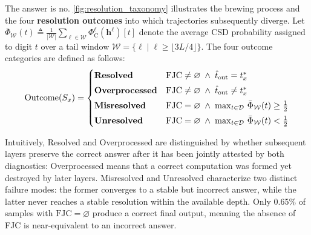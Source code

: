 The answer is no. \cref{fig:resolution_taxonomy} illustrates the brewing process and the four \textbf{resolution outcomes} into which trajectories subsequently diverge. Let $\bar{\Phi}_{\mathcal{W}}(t) \triangleq \frac{1}{|\mathcal{W}|}\sum_{\ell \in \mathcal{W}} \Phi_{\mathrm{C}}^\ell(\mathbf{h}^\ell)[t]$ denote the average CSD probability assigned to digit $t$ over a tail window $\mathcal{W} = \{\ell \mid \ell \geq \lfloor 3L/4 \rfloor\}$. The four outcome categories are defined as follows:
%
\begin{equation}
\label{eq:outcome_cases}
\resizebox{0.91\columnwidth}{!}{$\displaystyle
\mathrm{Outcome}(S_x) = \begin{cases}
\textbf{Resolved} & \mathrm{FJC} \neq \varnothing \;\land\; \hat{t}_{\mathrm{out}} = t_x^* \\[3pt]
\textbf{Overprocessed} & \mathrm{FJC} \neq \varnothing \;\land\; \hat{t}_{\mathrm{out}} \neq t_x^* \\[3pt]
\textbf{Misresolved} & \mathrm{FJC} = \varnothing \;\land\; \max_{t \in \mathcal{D}}\, \bar{\Phi}_{\mathcal{W}}(t) \geq \tfrac{1}{2} \\[3pt]
\textbf{Unresolved} & \mathrm{FJC} = \varnothing \;\land\; \max_{t \in \mathcal{D}}\, \bar{\Phi}_{\mathcal{W}}(t) < \tfrac{1}{2}
\end{cases}
$}
\end{equation}

Intuitively, Resolved and Overprocessed are distinguished by whether subsequent layers preserve the correct answer after it has been jointly attested by both diagnostics: Overprocessed means that a correct computation was formed yet destroyed by later layers. Misresolved and Unresolved characterize two distinct failure modes: the former converges to a stable but incorrect answer, while the latter never reaches a stable resolution within the available depth.
%
Only 0.65\% of samples with $\mathrm{FJC} = \varnothing$ produce a correct final output, meaning the absence of FJC is near-equivalent to an incorrect answer.

